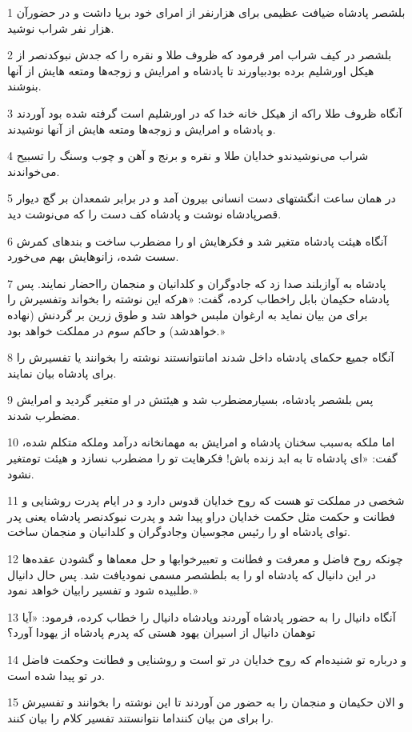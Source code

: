 \par 1 بلشصر پادشاه ضیافت عظیمی برای هزارنفر از امرای خود برپا داشت و در حضورآن هزار نفر شراب نوشید.
\par 2 بلشصر در کیف شراب امر فرمود که ظروف طلا و نقره را که جدش نبوکدنصر از هیکل اورشلیم برده بودبیاورند تا پادشاه و امرایش و زوجه‌ها ومتعه هایش از آنها بنوشند.
\par 3 آنگاه ظروف طلا راکه از هیکل خانه خدا که در اورشلیم است گرفته شده بود آوردند و پادشاه و امرایش و زوجه‌ها ومتعه هایش از آنها نوشیدند.
\par 4 شراب می‌نوشیدندو خدایان طلا و نقره و برنج و آهن و چوب وسنگ را تسبیح می‌خواندند.
\par 5 در همان ساعت انگشتهای دست انسانی بیرون آمد و در برابر شمعدان بر گچ دیوار قصرپادشاه نوشت و پادشاه کف دست را که می‌نوشت دید.
\par 6 آنگاه هیئت پادشاه متغیر شد و فکرهایش او را مضطرب ساخت و بندهای کمرش سست شده، زانوهایش بهم می‌خورد.
\par 7 پادشاه به آوازبلند صدا زد که جادوگران و کلدانیان و منجمان رااحضار نمایند. پس پادشاه حکیمان بابل راخطاب کرده، گفت: «هر‌که این نوشته را بخواند وتفسیرش را برای من بیان نماید به ارغوان ملبس خواهد شد و طوق زرین بر گردنش (نهاده خواهدشد) و حاکم سوم در مملکت خواهد بود.»
\par 8 آنگاه جمیع حکمای پادشاه داخل شدند امانتوانستند نوشته را بخوانند یا تفسیرش را برای پادشاه بیان نمایند.
\par 9 پس بلشصر پادشاه، بسیارمضطرب شد و هیئتش در او متغیر گردید و امرایش مضطرب شدند.
\par 10 اما ملکه به‌سبب سخنان پادشاه و امرایش به مهمانخانه درآمد وملکه متکلم شده، گفت: «ای پادشاه تا به ابد زنده باش! فکرهایت تو را مضطرب نسازد و هیئت تومتغیر نشود.
\par 11 شخصی در مملکت تو هست که روح خدایان قدوس دارد و در ایام پدرت روشنایی و فطانت و حکمت مثل حکمت خدایان دراو پیدا شد و پدرت نبوکدنصر پادشاه یعنی پدر تو‌ای پادشاه او را رئیس مجوسیان وجادوگران و کلدانیان و منجمان ساخت.
\par 12 چونکه روح فاضل و معرفت و فطانت و تعبیرخوابها و حل معماها و گشودن عقده‌ها در این دانیال که پادشاه او را به بلطشصر مسمی نمودیافت شد. پس حال دانیال طلبیده شود و تفسیر رابیان خواهد نمود.»
\par 13 آنگاه دانیال را به حضور پادشاه آوردند وپادشاه دانیال را خطاب کرده، فرمود: «آیا توهمان دانیال از اسیران یهود هستی که پدرم پادشاه از یهودا آورد؟
\par 14 و درباره تو شنیده‌ام که روح خدایان در تو است و روشنایی و فطانت وحکمت فاضل در تو پیدا شده است.
\par 15 و الان حکیمان و منجمان را به حضور من آوردند تا این نوشته را بخوانند و تفسیرش را برای من بیان کننداما نتوانستند تفسیر کلام را بیان کنند.

